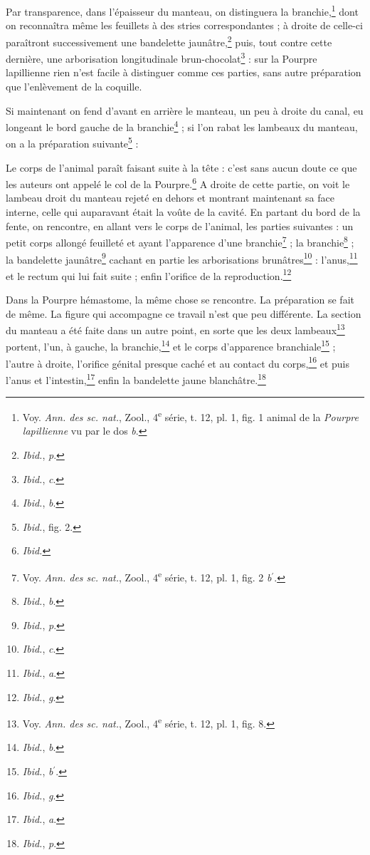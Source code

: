 \documentclass[a4paper, 11pt, oneside, polutonikogreek, french]{article}
\begin{document}
Par transparence, dans l'épaisseur du manteau, on distinguera la branchie,\footnote{Voy. \emph{Ann. des sc. nat.}, Zool., 4\textsuperscript{e} série, t. 12, pl. 1, fig. 1 animal de la \emph{Pourpre lapillienne} vu par le dos \emph{b}.} dont on reconnaîtra même les feuillets à des stries correspondantes ; à droite de celle-ci paraîtront successivement une bandelette jaunâtre,\footnote{\emph{Ibid.}, \emph{p}.} puis, tout contre cette dernière, une arborisation longitudinale brun-chocolat\footnote{\emph{Ibid.}, \emph{c}.} : sur la Pourpre lapillienne rien n'est facile à distinguer comme ces parties, sans autre préparation que l'enlèvement de la coquille.

Si maintenant on fend d'avant en arrière le manteau, un peu à droite du canal, eu longeant le bord gauche de la branchie\footnote{\emph{Ibid.}, \emph{b}.} ; si l'on rabat les lambeaux du manteau, on a la préparation suivante\footnote{\emph{Ibid.}, fig. 2.} :

Le corps de l'animal paraît faisant suite à la tête : c'est sans aucun doute ce que les auteurs ont appelé le col de la Pourpre.\footnote{\emph{Ibid.}} A droite de cette partie, on voit le lambeau droit du manteau rejeté en dehors et montrant maintenant sa face interne, celle qui auparavant était la voûte de la cavité. En partant du bord de la fente, on rencontre, en allant vers le corps de l'animal, les parties suivantes : un petit corps allongé feuilleté et ayant l'apparence d'une branchie\footnote{Voy. \emph{Ann. des sc. nat.}, Zool., 4\textsuperscript{e} série, t. 12, pl. 1, fig. 2 \emph{b}$^\prime$.} ; la branchie\footnote{\emph{Ibid.}, \emph{b}.} ; la bandelette jaunâtre\footnote{\emph{Ibid.}, \emph{p}.} cachant en partie les arborisations brunâtres\footnote{\emph{Ibid.}, \emph{c}.} : l'anus,\footnote{\emph{Ibid.}, \emph{a}.} et le rectum qui lui fait suite ; enfin l'orifice de la reproduction.\footnote{\emph{Ibid.}, \emph{g}.}

Dans la Pourpre hémastome, la même chose se rencontre. La préparation se fait de même. La figure qui accompagne ce travail n'est que peu différente. La section du manteau a été faite dans un autre point, en sorte que les deux lambeaux\footnote{Voy. \emph{Ann. des sc. nat.}, Zool., 4\textsuperscript{e} série, t. 12, pl. 1, fig. 8.} portent, l'un, à gauche, la branchie,\footnote{\emph{Ibid.}, \emph{b}.} et le corps d'apparence branchiale\footnote{\emph{Ibid.}, \emph{b}$^\prime$.} ; l'autre à droite, l'orifice génital presque caché et au contact du corps,\footnote{\emph{Ibid.}, \emph{g}.} et puis l'anus et l'intestin,\footnote{\emph{Ibid.}, \emph{a}.} enfin la bandelette jaune blanchâtre.\footnote{\emph{Ibid.}, \emph{p}.}
\end{document}
